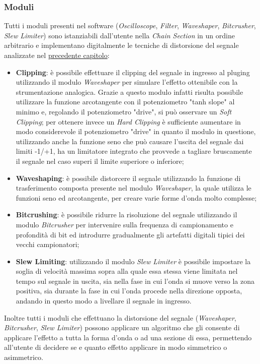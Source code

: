 \subsubsection*{Moduli}
Tutti i moduli presenti nel software (\textit{Oscilloscope}, \textit{Filter}, \textit{Waveshaper}, \textit{Bitcrusher}, \textit{Slew Limiter}) sono istanziabili dall'utente nella \textit{Chain Section} in un ordine arbitrario e implementano digitalmente le tecniche di distorsione del segnale analizzate nel \hyperref[cap:distorsione]{precedente capitolo}:
\begin{itemize}
    \item \textbf{Clipping}: è possibile effettuare il clipping del segnale in ingresso al \gls{pluging} utilizzando il modulo \textit{Waveshaper} per simulare l'effetto ottenibile con la strumentazione analogica. Grazie a questo modulo infatti risulta possibile utilizzare la funzione arcotangente con il potenziometro "tanh slope" al minimo e, regolando il potenziometro "drive", si può osservare un \textit{Soft Clipping}; per ottenere invece un \textit{Hard Clipping} è sufficiente aumentare in modo considerevole il potenziometro "drive" in quanto il modulo in questione, utilizzando anche la funzione seno che può causare l'uscita del segnale dai limiti -1/+1, ha un limitatore integrato che provvede a tagliare bruscamente il segnale nel caso superi il limite superiore o inferiore;
    \item \textbf{Waveshaping}: è possibile distorcere il segnale utilizzando la funzione di trasferimento composta presente nel modulo \textit{Waveshaper}, la quale utilizza le funzioni seno ed arcotangente, per creare varie forme d'onda molto complesse;
    \item \textbf{Bitcrushing}: è possibile ridurre la risoluzione del segnale utilizzando il modulo \textit{Bitcrusher} per intervenire sulla frequenza di campionamento e profondità di bit ed introdurre gradualmente gli artefatti digitali tipici dei vecchi campionatori;
    \item \textbf{Slew Limiting}: utilizzando il modulo \textit{Slew Limiter} è possibile impostare la soglia di velocità massima sopra alla quale essa stessa viene limitata nel tempo sul segnale in uscita, sia nella fase in cui l’onda si muove verso la zona positiva, sia durante la fase in cui l’onda procede nella direzione opposta, andando in questo modo a livellare il segnale in ingresso. \\
\end{itemize}
Inoltre tutti i moduli che effettuano la distorsione del segnale (\textit{Waveshaper}, \textit{Bitcrusher}, \textit{Slew Limiter}) possono applicare un algoritmo che gli consente di applicare l'effetto a tutta la forma d'onda o ad una sezione di essa, permettendo all'utente di decidere se e quanto effetto applicare in modo simmetrico o asimmetrico. \\ \\
